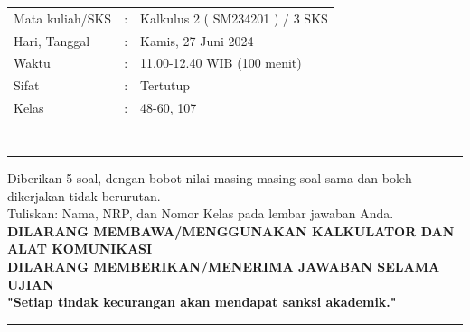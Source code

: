 \documentclass[10pt,openany,a4paper]{article}
\theoremstyle{definition}
\theoremstyle{definition}
\theoremstyle{plain}
\begin{document}
    \begin{center}
	\begin{tabular}{lcl}
		Mata kuliah/SKS & : & Kalkulus 2 ( SM234201 ) / 3 SKS\\
		Hari, Tanggal & : & Kamis, 27 Juni 2024\\
		Waktu & : & 11.00-12.40 WIB (100 menit)\\
		Sifat & : & Tertutup\\
		Kelas & : & 48-60, 107\\
  ~
	\end{tabular}

    \noindent\rule{\textwidth}{2.pt}
    \noindent Diberikan 5 soal, dengan bobot nilai masing-masing soal sama dan boleh dikerjakan tidak berurutan.\\
    Tuliskan: Nama, NRP, dan Nomor Kelas pada lembar jawaban Anda.\\
    \textbf{\MakeUppercase{dilarang membawa/menggunakan kalkulator dan alat komunikasi}}\\
    {\textbf{\MakeUppercase{dilarang memberikan/menerima jawaban selama ujian}}}\\
    {\textbf{"Setiap tindak kecurangan akan mendapat sanksi akademik."}}

	
    \noindent\rule{\textwidth}{2.pt}
        \end{center}
\end{document}
